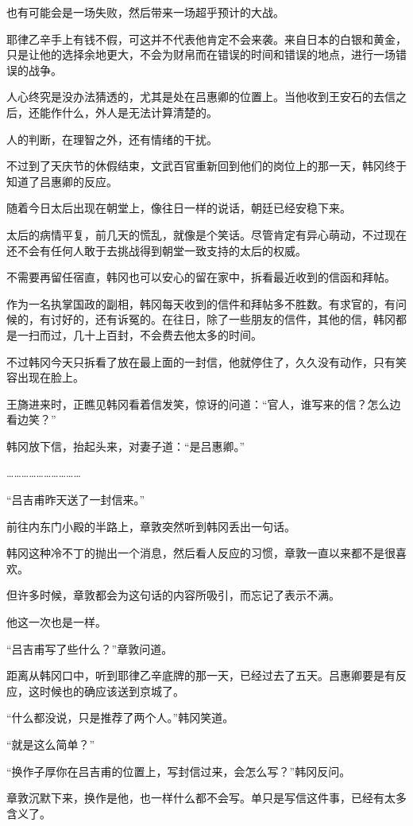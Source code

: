 也有可能会是一场失败，然后带来一场超乎预计的大战。

耶律乙辛手上有钱不假，可这并不代表他肯定不会来袭。来自日本的白银和黄金，只是让他的选择余地更大，不会为财帛而在错误的时间和错误的地点，进行一场错误的战争。

人心终究是没办法猜透的，尤其是处在吕惠卿的位置上。当他收到王安石的去信之后，还能作什么，外人是无法计算清楚的。

人的判断，在理智之外，还有情绪的干扰。

不过到了天庆节的休假结束，文武百官重新回到他们的岗位上的那一天，韩冈终于知道了吕惠卿的反应。

随着今日太后出现在朝堂上，像往日一样的说话，朝廷已经安稳下来。

太后的病情平复，前几天的慌乱，就像是个笑话。尽管肯定有异心萌动，不过现在还不会有任何人敢于去挑战得到朝堂一致支持的太后的权威。

不需要再留任宿直，韩冈也可以安心的留在家中，拆看最近收到的信函和拜帖。

作为一名执掌国政的副相，韩冈每天收到的信件和拜帖多不胜数。有求官的，有问候的，有讨好的，还有诉冤的。在往日，除了一些朋友的信件，其他的信，韩冈都是一扫而过，几十上百封，不会费去他太多的时间。

不过韩冈今天只拆看了放在最上面的一封信，他就停住了，久久没有动作，只有笑容出现在脸上。

王旖进来时，正瞧见韩冈看着信发笑，惊讶的问道：“官人，谁写来的信？怎么边看边笑？”

韩冈放下信，抬起头来，对妻子道：“是吕惠卿。”

…………………………

“吕吉甫昨天送了一封信来。”

前往内东门小殿的半路上，章敦突然听到韩冈丢出一句话。

韩冈这种冷不丁的抛出一个消息，然后看人反应的习惯，章敦一直以来都不是很喜欢。

但许多时候，章敦都会为这句话的内容所吸引，而忘记了表示不满。

他这一次也是一样。

“吕吉甫写了些什么？”章敦问道。

距离从韩冈口中，听到耶律乙辛底牌的那一天，已经过去了五天。吕惠卿要是有反应，这时候也的确应该送到京城了。

“什么都没说，只是推荐了两个人。”韩冈笑道。

“就是这么简单？”

“换作子厚你在吕吉甫的位置上，写封信过来，会怎么写？”韩冈反问。

章敦沉默下来，换作是他，也一样什么都不会写。单只是写信这件事，已经有太多含义了。

